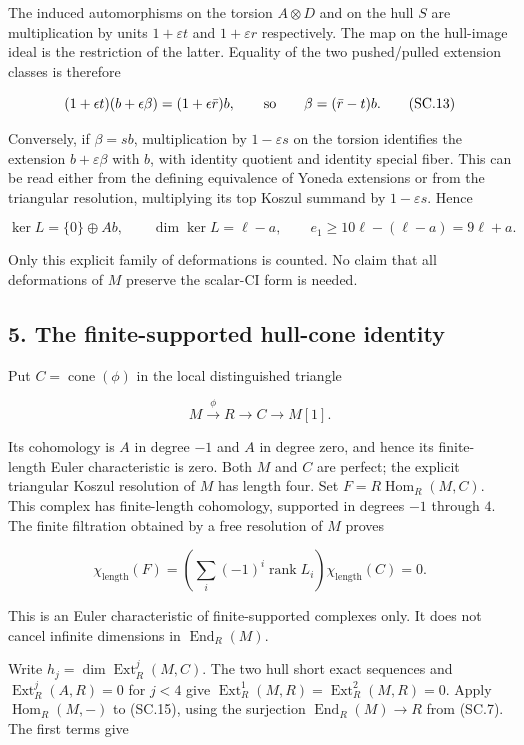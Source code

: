 The induced automorphisms on the torsion \(A\otimes D\) and on the hull \(S\)
are multiplication by units \(1+\varepsilon t\) and \(1+\varepsilon r\) respectively.
The map on the hull-image ideal is the restriction of the latter.
Equality of the two pushed/pulled extension classes is therefore

\[
 (1+\epsilon t)(b+\epsilon\beta)
       =(1+\epsilon\bar r)b,
 \qquad\hbox{so}\qquad
 \beta=(\bar r-t)b.
 \tag{SC.13}
\]

Conversely, if \(\beta=sb\), multiplication by \(1-\varepsilon s\) on the torsion
identifies the extension \(b+\varepsilon\beta\) with \(b\), with identity quotient
and identity special fiber. This can be read either from the defining
equivalence of Yoneda extensions or from the triangular resolution,
multiplying its top Koszul summand by \(1-\varepsilon s\). Hence

\[
 \ker L=\{0\}\oplus Ab,
 \qquad \dim\ker L=\ell-a,
 \qquad e_1\ge10\ell-(\ell-a)=9\ell+a.
 \tag{SC.14}
\]

Only this explicit family of deformations is counted. No claim that all
deformations of \(M\) preserve the scalar-CI form is needed.

\subsection{5. The finite-supported hull-cone identity}\label{SF-E847:s5}

Put \(C=\operatorname{cone}(\phi)\) in the local distinguished triangle

\[
 M\xrightarrow{\phi}R\longrightarrow C\longrightarrow M[1].
 \tag{SC.15}
\]

Its cohomology is \(A\) in degree \(-1\) and \(A\) in degree zero, and hence its
finite-length Euler characteristic is zero. Both \(M\) and \(C\) are perfect;
the explicit triangular Koszul resolution of \(M\) has length four.
Set \(F=R\operatorname{Hom}_R(M,C)\). This complex has finite-length cohomology, supported
in degrees \(-1\) through \(4\). The finite filtration obtained by a free
resolution of \(M\) proves

\[
 \chi_{\mathrm{length}}(F)
   =\left(\sum_i(-1)^i\operatorname{rank}L_i\right)
             \chi_{\mathrm{length}}(C)=0.
 \tag{SC.16}
\]

This is an Euler characteristic of finite-supported complexes only.
It does not cancel infinite dimensions in \(\operatorname{End}_R(M)\).

Write \(h_j=\dim\operatorname{Ext}^j_R(M,C)\). The two hull short exact sequences and
\(\operatorname{Ext}^j_R(A,R)=0\) for \(j<4\) give \(\operatorname{Ext}^1_R(M,R)=\operatorname{Ext}^2_R(M,R)=0\).
Apply \(\operatorname{Hom}_R(M,-)\) to (SC.15), using the surjection \(\operatorname{End}_R(M)\to R\)
from (SC.7). The first terms give

